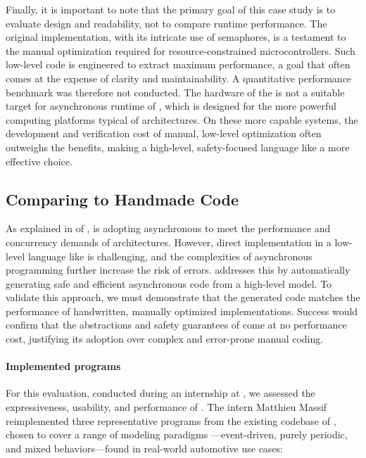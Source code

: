Finally, it is important to note that the primary goal of this case study is to evaluate design and
readability, not to compare runtime performance. The original \Ci implementation, with its intricate
use of semaphores, is a testament to the manual optimization required for resource-constrained
microcontrollers. Such low-level code is engineered to extract maximum performance, a goal that
often comes at the expense of clarity and maintainability. A quantitative performance benchmark was
therefore not conducted. The hardware of the \crazyflie is not a suitable target for asynchronous
runtime of \Rust, which is designed for the more powerful computing platforms typical of \sdv
architectures. On these more capable systems, the development and verification cost of manual,
low-level optimization often outweighs the benefits, making a high-level, safety-focused language
like \GRust a more effective choice.

\subsection{Comparing \GRust to Handmade \Rust Code}
\label{sec:grust:benchmarks:grust_vs_rust}

As explained in  of , \ampere is adopting asynchronous \Rust to meet the performance
and concurrency demands of \sdv architectures. However, direct implementation in a low-level
language like \Rust is challenging, and the complexities of asynchronous programming further
increase the risk of errors. \GRust addresses this by automatically generating safe and efficient
asynchronous \Rust code from a high-level model. To validate this approach, we must demonstrate that
the generated code matches the performance of handwritten, manually optimized implementations.
Success would confirm that the abstractions and safety guarantees of \GRust come at no performance
cost, justifying its adoption over complex and error-prone manual coding.

\paragraph{Implemented programs}

For this evaluation, conducted during an internship at \ampere, we assessed the expressiveness,
usability, and performance of \GRust. The intern Matthieu Massif reimplemented three representative
programs from the existing \sdv codebase of \ampere, chosen to cover a range of modeling paradigms%
---event-driven, purely periodic, and mixed behaviors---found in real-world automotive use cases:

